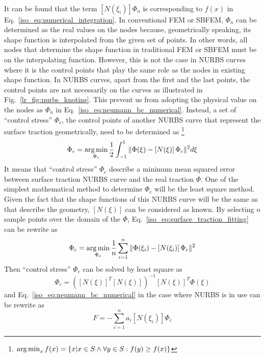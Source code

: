 \paragraph{}
It can be found that the term $[N(\xi_i)] \Phi_n$ is corresponding to $f(x)$ in Eq.~\ref{iso_eq:numerical_integration}.
In conventional FEM or SBFEM, $\Phi_n$ can be determined as the real values on the nodes because, geometrically speaking, its shape function is interpolated from the given set of points.
In other words, all nodes that determine the shape function in traditional FEM or SBFEM must be on the interpolating function.
However, this is not the case in NURBS curves where it is the control points that play the same role as the nodes in existing shape function.
In NURBS curves, apart from the first and the last points, the control points are not necessarily on the curves as illustrated in Fig.~\ref{lr_fig:nurbs_knotins}.
This prevent us from adopting the physical value on the nodes as $\Phi_n$ in Eq.~\ref{iso_eq:neumann_bc_numerical}.
Instead, a set of ``control stress'' $\Phi_c$, the control points of another NURBS curve that represent the surface traction
    geometrically, need to be determined as \footnote{$\operatorname*{arg\,min}_x f(x) = \left\{
        x | x \in S \wedge \forall y \in S : f(y) \geq f(x)
    \right\}$}
    \begin{equation}
        \Phi_c = \operatorname*{arg\,min}_{\Phi_c}
            \frac{1}{2}
            \int_{-1}^1
            \|
                \Phi(\xi)-
                    \left[ N(\xi) \right]
                    \Phi_c
            \|^2
            d\xi            
    \label{iso_eq:surface_traction_fitting}
    \end{equation}
%
It means that ``control stress'' $\Phi_c$ describe a minimum mean squared error between surface traction NURBS curve and the real traction $\Phi$.
One of the simplest mathematical method to determine $\Phi_c$ will be the least square method.
Given the fact that the shape functions of this NURBS curve will be the same as that describe the geometry, $\left[ N(\xi) \right]$ can be considered as known.
By selecting $n$ sample points over the domain of the $\Phi$, Eq.~\ref{iso_eq:surface_traction_fitting} can be rewrite as
    \begin{equation}
        \Phi_c = \operatorname*{arg\,min}_{\Phi_c}
            \frac{1}{n}
            \sum_{i=1}^n
            \|
                \Phi(\xi_i)-
                    \left[ N(\xi_i) \right]
                    \Phi_c
            \|^2
    \label{iso_eq:surface_traction_fitting_discrete}
    \end{equation}
Then ``control stress'' $\Phi_c$ can be solved by least square as
    \begin{equation}
        \Phi_c= \left(
            \left[ N(\xi) \right] ^T
            \left[ N(\xi) \right]
        \right)^{-1}
        \left[ N(\xi) \right]^T
        \Phi(\xi)
    \end{equation}
and Eq.~\ref{iso_eq:neumann_bc_numerical} in the case where NURBS is in use can be rewrite as
    \begin{equation}
        {F}=-\sum_{i=1}^n
        a_i
        [N(\xi_i)]
        \Phi_c
    \label{iso_eq:neumann_bc_numerical_NURBS}
    \end{equation}
